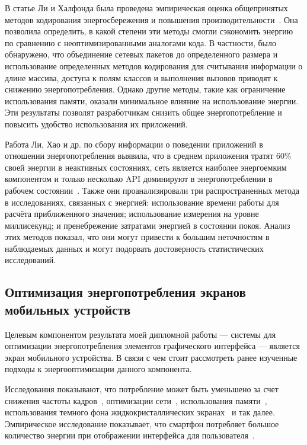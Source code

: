 \documentclass[a4paper,14pt]{extarticle} %
\begin{document}
	В статье  Ли и Халфонда была проведена эмпирическая оценка общепринятых методов кодирования энергосбережения и повышения производительности~\parencite{li2014investigation}. Она позволила определить, в какой степени эти методы смогли сэкономить энергию по сравнению с неоптимизированными аналогами кода. В частности, было обнаружено, что объединение сетевых пакетов до определенного размера и использование определенных методов кодирования для считывания информации о длине массива, доступа к полям классов и выполнения вызовов приводят к снижению энергопотребления. Однако другие методы, такие как ограничение использования памяти, оказали минимальное влияние на использование энергии. Эти результаты позволят разработчикам снизить общее энергопотребление и повысить удобство использования их приложений.
	
	Работа Ли, Хао и др. по сбору информации о поведении приложений в отношении энергопотребления выявила, что в среднем приложения тратят 60\% своей энергии в неактивных состояниях, сеть является наиболее энергоемким компонентом и только несколько API доминируют в энергопотреблении в рабочем состоянии~\parencite{li2014empirical}. Также они проанализировали три распространенных метода в исследованиях, связанных с энергией: использование времени работы для расчёта приближенного значения; использование измерения на уровне миллисекунд; и пренебрежение затратами энергией в состоянии покоя. Анализ этих методов показал, что они могут привести к большим неточностям в наблюдаемых данных и могут подорвать достоверность статистических исследований.
	
	\subsection{Оптимизация энергопотребления экранов мобильных устройств}
	
	Целевым компонентом результата моей дипломной работы — системы для оптимизации энергопотребления элементов графического интерфейса — является экран мобильного устройства. В связи с чем стоит рассмотреть ранее изученные подходы к энергооптимизации данного компонента.
	
	Исследования показывают, что потребление может быть уменьшено за счет снижения частоты кадров~\parencite{lee2018improving}, оптимизации сети~\parencite{tuysuz2019real}, использования памяти~\parencite{li2014investigation}, использования темного фона жидкокристаллических экранах~\parencite{утин2018адаптивное} и так далее. Эмпирическое исследование показывает, что смартфон потребляет большое количество энергии при отображении интерфейса для пользователя~\parencite{li2014empirical}. 
	
\end{document}
